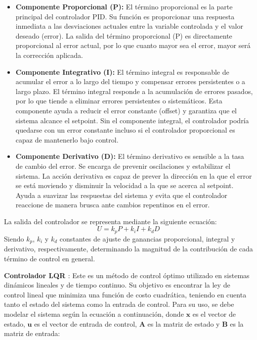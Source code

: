 \begin{itemize}
	\item \textbf{Componente Proporcional (P):} El término proporcional es la parte principal del controlador PID. Su función es proporcionar una respuesta inmediata a las desviaciones actuales entre la variable controlada y el valor deseado (error). La salida del término proporcional (P) es directamente proporcional al error actual, por lo que cuanto mayor sea el error, mayor será la corrección aplicada.
	
	\item \textbf{Componente Integrativo (I):} El término integral es responsable de acumular el error a lo largo del tiempo y compensar errores persistentes o a largo plazo. El término integral responde a la acumulación de errores pasados, por lo que tiende a eliminar errores persistentes o sistemáticos. Esta componente ayuda a reducir el error constante (offset) y garantiza que el sistema alcance el setpoint. Sin el componente integral, el controlador podría quedarse con un error constante incluso si el controlador proporcional es capaz de mantenerlo bajo control.
	
	\item \textbf{Componente Derivativo (D):} El término derivativo es sensible a la tasa de cambio del error. Se encarga de prevenir oscilaciones y estabilizar el sistema. La acción derivativa es capaz de prever la dirección en la que el error se está moviendo y disminuir la velocidad a la que se acerca al setpoint. Ayuda a suavizar las respuestas del sistema y evita que el controlador reaccione de manera brusca ante cambios repentinos en el error.
\end{itemize}

La salida del controlador se representa mediante la siguiente ecuación:
\[
U = k_p P + k_i I + k_d D
\]
Siendo $k_p$, $k_i$ y $k_d$ constantes de ajuste de ganancias proporcional, integral y derivativo, respectivamente, determinando la magnitud de la contribución de cada término de control en general.

\textbf{Controlador \gls{LQR} \cite{ref29}}: Este es un método de control óptimo utilizado en sistemas dinámicos lineales y de tiempo continuo. Su objetivo es encontrar la ley de control lineal que minimiza una función de costo cuadrática, teniendo en cuenta tanto el estado del sistema como la entrada de control. Para su uso, se debe modelar el sistema según la ecuación a continuación, donde \( \mathbf{x} \) es el vector de estado, \( \mathbf{u} \) es el vector de entrada de control, \( \mathbf{A} \) es la matriz de estado y \( \mathbf{B} \) es la matriz de entrada:

